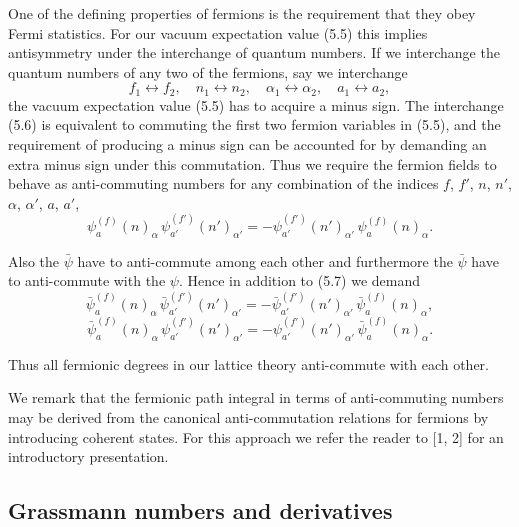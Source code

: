One of the defining properties of fermions is the requirement that they
obey Fermi statistics. For our vacuum expectation value (5.5) this implies
antisymmetry under the interchange of quantum numbers. If we interchange
the quantum numbers of any two of the fermions, say we interchange
\begin{equation}
  f_1 \leftrightarrow f_2, \quad n_1 \leftrightarrow n_2, \quad
  \alpha_1 \leftrightarrow \alpha_2, \quad a_1 \leftrightarrow a_2,
\end{equation}
the vacuum expectation value (5.5) has to acquire a minus sign. The interchange (5.6) is equivalent to commuting the first two fermion variables in
(5.5), and the requirement of producing a minus sign can be accounted for by
demanding an extra minus sign under this commutation. Thus we require the
fermion fields to behave as anti-commuting numbers for any combination of
the indices $f$, $f'$, $n$, $n'$, $\alpha$, $\alpha'$, $a$, $a'$,
\begin{equation}
  \psi^{(f)}_{a}(n)_{\alpha}\,
  \psi^{(f')}_{a'}(n')_{\alpha'}
  = -\psi^{(f')}_{a'}(n')_{\alpha'}\,
  \psi^{(f)}_{a}(n)_{\alpha} .
\end{equation}

Also the $\bar{\psi}$ have to anti-commute among each other and furthermore the $\bar{\psi}$
have to anti-commute with the $\psi$. Hence in addition to (5.7) we demand
\begin{equation}
  \bar{\psi}^{(f)}_{a}(n)_{\alpha}\,
  \bar{\psi}^{(f')}_{a'}(n')_{\alpha'}
  = -\bar{\psi}^{(f')}_{a'}(n')_{\alpha'}\,
  \bar{\psi}^{(f)}_{a}(n)_{\alpha} ,
\end{equation}
\begin{equation}
  \bar{\psi}^{(f)}_{a}(n)_{\alpha}\,
  \psi^{(f')}_{a'}(n')_{\alpha'}
  = -\psi^{(f')}_{a'}(n')_{\alpha'}\,
  \bar{\psi}^{(f)}_{a}(n)_{\alpha} .
\end{equation}

Thus all fermionic degrees in our lattice theory anti-commute with each other.

We remark that the fermionic path integral in terms of anti-commuting
numbers may be derived from the canonical anti-commutation relations for
fermions by introducing coherent states. For this approach we refer the reader
to [1, 2] for an introductory presentation.

\subsection{Grassmann numbers and derivatives}

